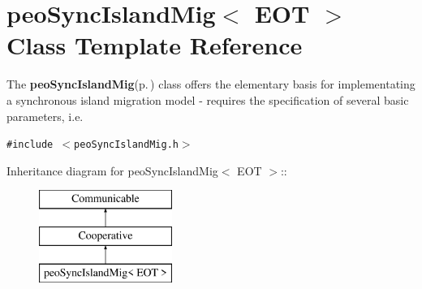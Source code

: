 \section{peo\-Sync\-Island\-Mig$<$ EOT $>$ Class Template Reference}
\label{classpeo_sync_island_mig}
The {\bf peo\-Sync\-Island\-Mig}{\rm (p.\,\pageref{classpeo_sync_island_mig})} class offers the elementary basis for implementating a synchronous island migration model - requires the specification of several basic parameters, i.e.  


{\tt \#include $<$peo\-Sync\-Island\-Mig.h$>$}

Inheritance diagram for peo\-Sync\-Island\-Mig$<$ EOT $>$::\begin{figure}[H]
\begin{center}
\leavevmode
\includegraphics[height=3cm]{classpeo_sync_island_mig}
\end{center}
\end{figure}
